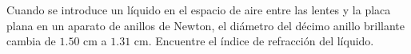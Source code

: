 \item Cuando se introduce un líquido en el espacio de aire entre las lentes y la placa plana en un aparato de anillos de Newton, el diámetro del décimo anillo brillante cambia de $1.50\text{ cm}$ a $1.31\text{ cm}$. Encuentre el índice de refracción del líquido.